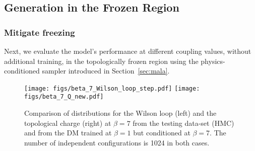 \documentclass[a4paper,11pt]{article}
\begin{document}
\begin{table}[hbpt!] 
    \centering 
    \caption{Comparison of observables for $\beta=1$ at different lattice sizes}
    \label{tab:L_beta1}
    \renewcommand{\arraystretch}{1.3} 
\end{table}

\subsection{Generation in the Frozen Region}


\subsubsection{Mitigate freezing}

Next, we evaluate the model’s performance at different coupling values, without additional training, in the topologically frozen region using the physics-conditioned sampler introduced in Section~\ref{sec:mala}.

\begin{figure}[hbtp!]
\begin{center}
    \texttt{[image: figs/beta\_7\_Wilson\_loop\_step.pdf]}
    \texttt{[image: figs/beta\_7\_Q\_new.pdf]}
\end{center}
\caption{
    Comparison of distributions for the Wilson loop (left)  and the topological charge (right) at $\beta = 7$ from the testing data-set (HMC) and from the DM trained at $\beta=1$ but conditioned at $\beta=7$. The number of independent configurations is 1024 in both cases.
}
\label{fig:beta-7}
\end{figure}
\end{document}
